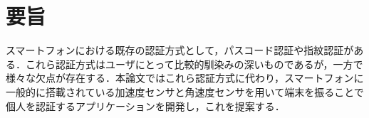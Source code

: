 \chapter*{要旨}
スマートフォンにおける既存の認証方式として，パスコード認証や指紋認証がある．これら認証方式はユーザにとって比較的馴染みの深いものであるが，一方で様々な欠点が存在する．本論文ではこれら認証方式に代わり，スマートフォンに一般的に搭載されている加速度センサと角速度センサを用いて端末を振ることで個人を認証するアプリケーションを開発し，これを提案する．

